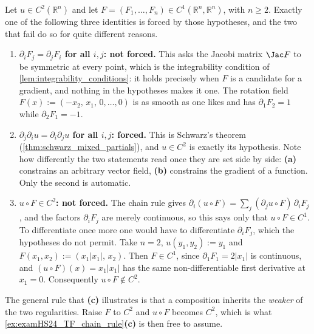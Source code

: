 \begin{example}
\label{ex:forced_identities_chain_rule}
Let $u \in C^2(\mathbb{R}^n)$ and let $F = (F_1,\dots,F_n) \in C^1(\mathbb{R}^n,\mathbb{R}^n)$,
with $n \geq 2$. Exactly one of the following three identities is forced by those hypotheses, and
the two that fail do so for quite different reasons.
\begin{enumerate}[label=\textbf{(\alph*)}]
  \item \textbf{$\partial_iF_j = \partial_jF_i$ for all $i,j$: not forced.} This asks the Jacobi
    matrix $\Jac F$ to be symmetric at every point, which is the integrability condition of
    \cref{lem:integrability_conditions}: it holds precisely when $F$ is a candidate for a gradient,
    and nothing in the hypotheses makes it one. The rotation field
    $F(x) := (-x_2,\, x_1,\, 0,\dots,0)$ is as smooth as one likes and has $\partial_1F_2 = 1$
    while $\partial_2F_1 = -1$.
  \item \textbf{$\partial_j\partial_iu = \partial_i\partial_ju$ for all $i,j$: forced.} This is
    Schwarz's theorem (\cref{thm:schwarz_mixed_partials}), and $u \in C^2$ is exactly its hypothesis.
    Note how differently the two statements read once they are set side by side: \textbf{(a)}
    constrains an arbitrary vector field, \textbf{(b)} constrains the gradient of a function. Only
    the second is automatic.
  \item \textbf{$u \circ F \in C^2$: not forced.} The chain rule gives
    $\partial_i(u\circ F) = \sum_{j}(\partial_ju\circ F)\,\partial_iF_j$, and the factors
    $\partial_iF_j$ are merely continuous, so this says only that $u \circ F \in C^1$. To
    differentiate once more one would have to differentiate $\partial_iF_j$, which the hypotheses
    do not permit. Take $n = 2$, $u(y_1,y_2) := y_1$ and $F(x_1,x_2) := (x_1\lvert x_1\rvert,\, x_2)$.
    Then $F \in C^1$, since $\partial_1F_1 = 2\lvert x_1\rvert$ is continuous, and
    $(u\circ F)(x) = x_1\lvert x_1\rvert$ has the same non-differentiable first derivative at
    $x_1 = 0$. Consequently $u \circ F \notin C^2$.
\end{enumerate}
The general rule that \textbf{(c)} illustrates is that a composition inherits the \emph{weaker} of
the two regularities. Raise $F$ to $C^2$ and $u \circ F$ becomes $C^2$, which is what
\cref{ex:examHS24_TF_chain_rule}\textbf{(c)} is then free to assume.
\end{example}

